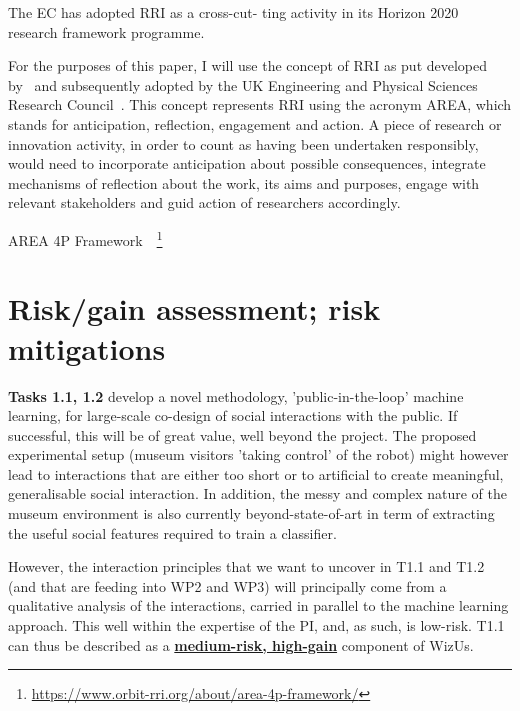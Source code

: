 \documentclass[11pt,a4paper]{report}
\newcommand{\project}{WizUs\xspace}
\begin{document}
The EC has adopted RRI as a cross-cut-
ting activity in its Horizon 2020 research framework programme.

For the purposes of this paper, I will use the concept of RRI as put developed
by~\cite{stilgoe2013developing} and subsequently adopted by the UK Engineering
and Physical Sciences Research Council~\cite{owen2014uk}. This concept
represents RRI using the acronym AREA, which stands for anticipation,
reflection, engagement and action. A piece of research or innovation activity,
in order to count as having been undertaken responsibly, would need to
incorporate anticipation about possible consequences, integrate mechanisms of
reflection about the work, its aims and purposes, engage with relevant
stakeholders and guid action of researchers accordingly.

AREA 4P
Framework~\cite{stahl2018implementing}~\footnote{\url{https://www.orbit-rri.org/about/area-4p-framework/}}



\section{Risk/gain assessment; risk mitigations}\label{risks}

\textbf{Tasks 1.1, 1.2} develop a novel methodology, 'public-in-the-loop' machine
learning, for large-scale co-design of social interactions with the public. If
successful, this will be of great value, well beyond the project. The
proposed experimental setup (museum visitors 'taking control' of the robot)
might however lead to interactions that are either too short or to artificial to
create meaningful, generalisable social interaction. In addition, the messy and
complex nature of the museum environment is also currently beyond-state-of-art
in term of extracting the useful social features required to train a classifier.

However, the interaction principles that we want to uncover in T1.1 and T1.2
(and that are feeding into WP2 and WP3) will principally come from a qualitative
analysis of the interactions, carried in parallel to the machine learning
approach. This well within the expertise of the PI, and, as such, is low-risk.
T1.1 can thus be described as a \ul{\bf medium-risk, high-gain} component of
\project.
\end{document}

